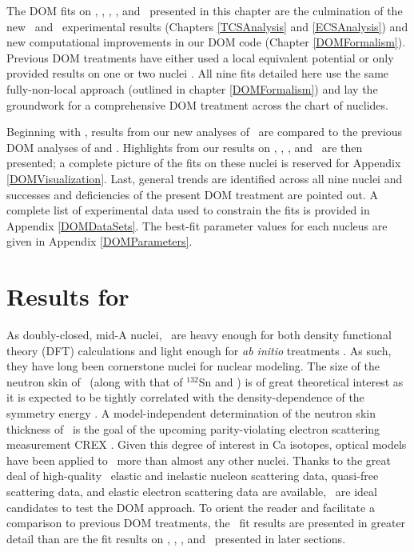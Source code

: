 The \gls{DOM} fits on \oSixEight, \caAughtEight, \niEightFour,
\snTwelveFour, and \pbEight\ presented in
this chapter are the culmination of the new \tot\ and \el\ experimental results
(Chapters \ref{TCSAnalysis} and \ref{ECSAnalysis})
and new computational improvements in our DOM code (Chapter \ref{DOMFormalism}).
Previous DOM treatments have either used a
local equivalent potential \cite{Charity2006, Mueller2011} or only provided results on one or
two nuclei \cite{Mahzoon2017, Atkinson2018}. All nine fits detailed here use the
same fully-non-local approach
(outlined in chapter \ref{DOMFormalism}) and lay the groundwork for a comprehensive DOM treatment 
across the chart of nuclides.

Beginning with \caForty, results from our new analyses of
\caAughtEight\ are compared to the previous
DOM analyses of \cite{MahzoonPhDThesis} and 
\cite{Atkinson2018}. Highlights from our results on \oSixEight, \niEightFour, \snTwelveFour,
and \pbEight\ are then presented; a complete picture of the fits on these nuclei
is reserved for Appendix \ref{DOMVisualization}. Last, general trends are identified across
all nine nuclei and successes and deficiencies of the present DOM treatment are pointed out.
A complete list of experimental data used to constrain the fits is provided in Appendix
\ref{DOMDataSets}. The best-fit parameter values for each nucleus are given in Appendix
\ref{DOMParameters}.

\section{Results for \caAughtEight}
As doubly-closed, mid-A nuclei, \caAughtEight\ are heavy enough for both density functional
theory (DFT) calculations \cite{Piekarewicz2012} and light enough for \textit{ab initio} 
treatments \cite{Hagen2016}. As such, they have long been cornerstone nuclei for
nuclear modeling. The size of the neutron skin of \caEight\ (along with that of $^{132}$Sn and
\pbEight) is of great theoretical interest as it is expected to be tightly correlated with the
density-dependence of the symmetry energy \cite{Fattoyev2012}. A model-independent determination
of the neutron skin thickness of \caEight\ is the goal of the upcoming parity-violating
electron scattering measurement CREX \cite{Horowitz2014}. Given this degree of interest in Ca
isotopes, optical models have been applied to
\caAughtEight\ more than almost any other nuclei. Thanks to the
great deal of high-quality \caAughtEight\ 
elastic and inelastic nucleon scattering data, quasi-free scattering data, and elastic electron
scattering data are available, \caAughtEight\ are ideal
candidates to test the DOM approach. To orient the
reader and facilitate a comparison to previous DOM treatments, the \caAughtEight\ fit results are
presented in greater detail than are the fit results on \oSixEight, \niEightFour,
\snTwelveFour, and \pbEight\ presented in later sections.

